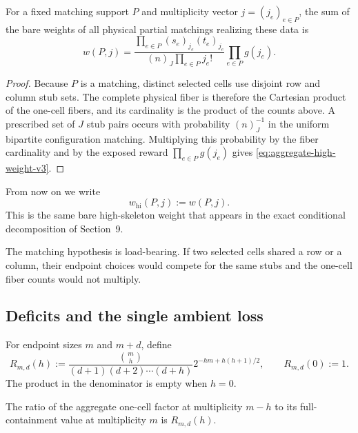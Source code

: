 \begin{proposition}
\label{prop:aggregate-high-weight-v3}
For a fixed matching support $P$ and multiplicity vector
$j=(j_e)_{e\in P}$, the sum of the bare weights of all physical partial
matchings realizing these data is
\begin{equation}
  w(P,j)
  =
  \frac{
    \displaystyle\prod_{e\in P}(s_e)_{j_e}(t_e)_{j_e}
  }{
    \displaystyle(n)_J\prod_{e\in P}j_e!
  }
  \prod_{e\in P}g(j_e).
  \label{eq:aggregate-high-weight-v3}
\end{equation}
\end{proposition}

\begin{proof}
Because $P$ is a matching, distinct selected cells use disjoint row and column
stub sets. The complete physical fiber is therefore the Cartesian product of
the one-cell fibers, and its cardinality is the product of the counts above.
A prescribed set of $J$ stub pairs occurs with probability $(n)_J^{-1}$ in the
uniform bipartite configuration matching. Multiplying this probability by the
fiber cardinality and by the exposed reward
$\prod_{e\in P}g(j_e)$ gives \eqref{eq:aggregate-high-weight-v3}.
\end{proof}

From now on we write
\[
  w_{\mathrm{hi}}(P,j):=w(P,j).
\]
This is the same bare high-skeleton weight that appears in the exact
conditional decomposition of Section~9.

\begin{remark}
The matching hypothesis is load-bearing. If two selected cells shared a row or
a column, their endpoint choices would compete for the same stubs and the
one-cell fiber counts would not multiply.
\end{remark}

\subsection{Deficits and the single ambient loss}

For endpoint sizes $m$ and $m+d$, define
\begin{equation}
  R_{m,d}(h)
  :=
  \frac{\binom mh}
       {(d+1)(d+2)\cdots(d+h)}
  2^{-hm+h(h+1)/2},
  \qquad
  R_{m,d}(0):=1.
  \label{eq:local-deficit-ratio-v3}
\end{equation}
The product in the denominator is empty when $h=0$.

\begin{lemma}
\label{lem:exact-local-ratio-v3}
The ratio of the aggregate one-cell factor at multiplicity $m-h$ to its
full-containment value at multiplicity $m$ is $R_{m,d}(h)$.
\end{lemma}

